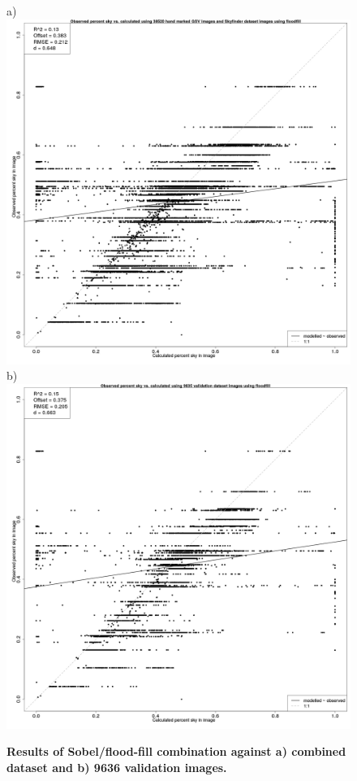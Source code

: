 \documentclass[final,3p,times,authoryear]{elsarticle}
\begin{document}
\begin{figure}
\centering
a)\includegraphics[scale=0.12]{Images/ErrorPlots2FloodfillAll.png}
b)\includegraphics[scale=0.12]{Images/ErrorPlots2FloodfillValidation.png}
\caption{\textbf{Results of Sobel/flood-fill combination against a) combined dataset and b) 9636 validation images.}}
\label{fig:errorfloodall}
\end{figure}
\end{document}
